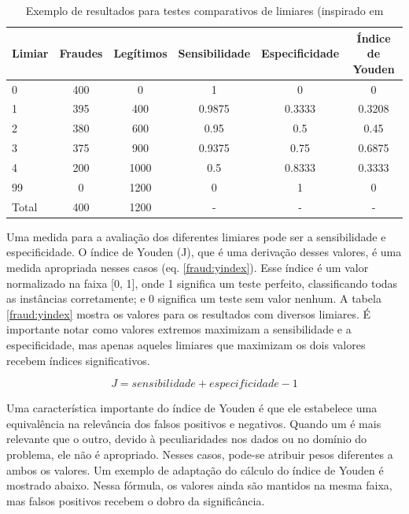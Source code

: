 \vspace{2mm}
\begin{table}[h!]
    \caption{Exemplo de resultados para testes comparativos de limiares (inspirado em \citet{Bewick2004}}
    \centering
    \begin{tabular}{l c c c c c}
        \hline
        Limiar & Fraudes & Legítimos & Sensibilidade & Especificidade & Índice de Youden \\
        \hline
        0     & 400 &    0 & 1      & 0      & 0      \\
        1     & 395 &  400 & 0.9875 & 0.3333 & 0.3208  \\
        2     & 380 &  600 & 0.95   & 0.5    & 0.45   \\
        3     & 375 &  900 & 0.9375 & 0.75   & 0.6875 \\
        4     & 200 & 1000 & 0.5    & 0.8333 & 0.3333 \\
        99    &   0 & 1200 & 0      & 1      & 0      \\
        \hline
        Total & 400 & 1200 &    -   &    -   &    -   \\
        \hline
    \end{tabular}
    \label{fraud:youden}
\end{table}
\vspace{2mm}

Uma medida para a avaliação dos diferentes limiares pode ser a sensibilidade e especificidade. O índice de Youden (J), que é uma derivação desses valores, é uma medida apropriada nesses casos (eq. \ref{fraud:yindex}). Esse índice é um valor normalizado na faixa [0, 1], onde 1 significa um teste perfeito, classificando todas as instâncias corretamente; e 0 significa um teste sem valor nenhum. A tabela \ref{fraud:yindex} mostra os valores para os resultados com diversos limiares. É importante notar como valores extremos maximizam a sensibilidade e a especificidade, mas apenas aqueles limiares que maximizam os dois valores recebem índices significativos.

\vspace{2mm}
\begin{equation}
    J = sensibilidade + especificidade - 1
    \label{fraud:yindex}
\end{equation}
\vspace{2mm}

Uma característica importante do índice de Youden é que ele estabelece uma equivalência na relevância dos falsos positivos e negativos. Quando um é mais relevante que o outro, devido à peculiaridades nos dados ou no domínio do problema, ele não é apropriado. Nesses casos, pode-se atribuir pesos diferentes a ambos os valores. Um exemplo de adaptação do cálculo do índice de Youden é mostrado abaixo. Nessa fórmula, os valores ainda são mantidos na mesma faixa, mas falsos positivos recebem o dobro da significância.

